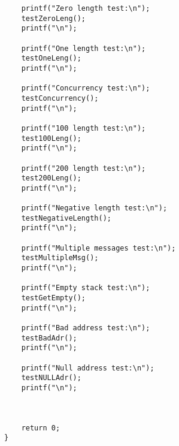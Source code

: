 \documentclass[12pt,a4paper]{report}
\begin{document}
\begin{verbatim}
    printf("Zero length test:\n");
    testZeroLeng();
    printf("\n");

    printf("One length test:\n");
    testOneLeng();
    printf("\n");

    printf("Concurrency test:\n");
    testConcurrency();
    printf("\n");

    printf("100 length test:\n");
    test100Leng();
    printf("\n");

    printf("200 length test:\n");
    test200Leng();
    printf("\n");

    printf("Negative length test:\n");
    testNegativeLength();
    printf("\n");

    printf("Multiple messages test:\n");
    testMultipleMsg();
    printf("\n");

    printf("Empty stack test:\n");
    testGetEmpty();
    printf("\n");

    printf("Bad address test:\n");
    testBadAdr();
    printf("\n");

    printf("Null address test:\n");
    testNULLAdr();
    printf("\n");



    return 0;
}

\end{verbatim}
\end{document}
